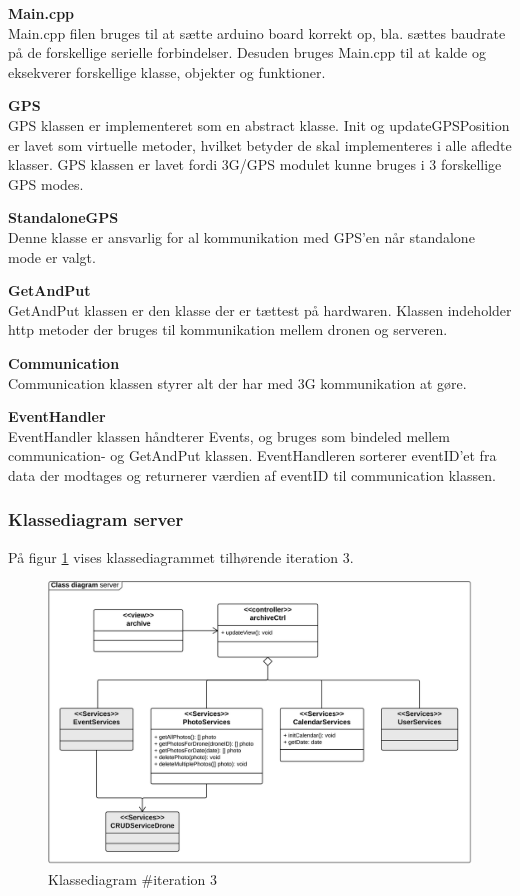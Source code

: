 \textbf{Main.cpp} \\
Main.cpp filen bruges til at sætte arduino board korrekt op, bla. sættes baudrate på de forskellige serielle forbindelser. Desuden bruges Main.cpp til at kalde og eksekverer forskellige klasse, objekter og funktioner. 

\textbf{GPS} \\
GPS klassen er implementeret som en abstract klasse. Init og updateGPSPosition er lavet som virtuelle metoder, hvilket betyder de skal implementeres i alle afledte klasser. GPS klassen er lavet fordi 3G/GPS modulet kunne bruges i 3 forskellige GPS modes. 

\textbf{StandaloneGPS}\\
Denne klasse er ansvarlig for al kommunikation med GPS'en når standalone mode er valgt. 

\textbf{GetAndPut} \\
GetAndPut klassen er den klasse der er tættest på hardwaren. Klassen indeholder http metoder der bruges til kommunikation mellem dronen og serveren. 

\textbf{Communication} \\
Communication klassen styrer alt der har med 3G kommunikation at gøre.

\textbf{EventHandler} \\
EventHandler klassen håndterer Events, og bruges som bindeled mellem communication- og GetAndPut klassen. EventHandleren sorterer eventID'et fra data der modtages og returnerer værdien af eventID til communication klassen. 




\newpage

\subsubsection*{Klassediagram server}

På figur \ref{fig:classDiagram_iteration3} vises klassediagrammet tilhørende iteration 3. 

\begin{figure}[H]
	\centering
	\includegraphics[width=1\textwidth]{Billeder/klasse_diagrammer/classdiagram_iteration3_server.png}
	\vspace{-0.5cm}
	\caption{Klassediagram \#iteration 3}
	\label{fig:classDiagram_iteration3}
\end{figure}

